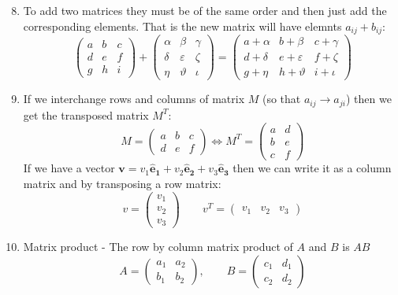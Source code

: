 \documentclass{article}
\renewcommand{\vec}[1]{\bm{#1}}
\newcommand{\vv}[1]{\vec{#1}}
\newcommand{\ve}[1]{\vec{\hat{e}_{#1}}}
\begin{document}
\begin{enumerate}
\setcounter{enumi}{7}
\item To add two matrices they must be of the same order and then just add the corresponding elements. That is the new matrix will have elemnts \(a_{ij}+b_{ij}\):
\[
\begin{pmatrix}
a & b & c\\
d & e & f\\
g & h & i
\end{pmatrix}
+
\begin{pmatrix}
\alpha & \beta & \gamma\\
\delta & \varepsilon & \zeta\\
\eta & \vartheta & \iota
\end{pmatrix}
=
\begin{pmatrix}
a+\alpha & b+\beta & c+\gamma\\
d+\delta & e+\varepsilon & f+\zeta\\
g+\eta & h+\vartheta & i+\iota
\end{pmatrix}
\]
\item If we interchange rows and columns of matrix \(M\) (so that \(a_{ij}\longrightarrow a_{ji}\)) then we get the transposed matrix \(M^T\):
\[M=
\begin{pmatrix}
a & b & c\\
d & e & f
\end{pmatrix}
\iff M^T=
\begin{pmatrix}
a & d\\
b & e\\
c & f
\end{pmatrix}
\]
If we have a vector \(\vv v=v_1\ve1+v_2\ve2+v_3\ve3\) then we can write it as a column matrix and by transposing a row matrix:
\[v=
\begin{pmatrix}
v_1\\ v_2\\ v_3
\end{pmatrix}
\qquad v^T=
\begin{pmatrix}
v_1 & v_2 & v_3
\end{pmatrix}
\]
\item Matrix product - The row by column matrix product of \(A\) and \(B\) is \(AB\)
\[A=
\begin{pmatrix}
a_1 & a_2\\
b_1 & b_2
\end{pmatrix}
,\qquad B=
\begin{pmatrix}
c_1 & d_1\\
c_2 & d_2
\end{pmatrix}
\]
\end{enumerate}
\end{document}
